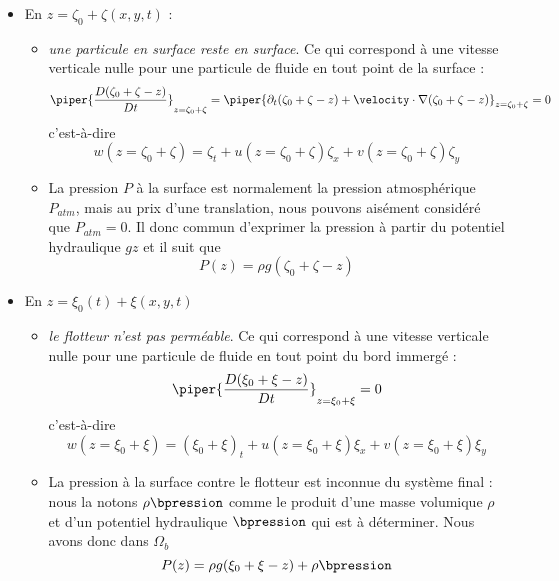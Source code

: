 \begin{itemize}[label=$\mybullet$]
	\item En $z = \zeta_0 + \zeta(x, y, t)$ : 
	\begin{itemize}[label=$\mybullet\mybullet$]
		\item \textit{une particule en surface reste en surface}. Ce qui correspond à une vitesse verticale nulle pour une particule de fluide en tout point de la surface : 
		\begin{equation*}
		\piper{\frac{D (\zeta_0+\zeta - z)}{Dt}}_{z=\zeta_0+\zeta} = \piper{\partial_t (\zeta_0 + \zeta - z) + \velocity \cdot \nabla (\zeta_0 + \zeta - z)}_{z=\zeta_0+\zeta} = 0
		\end{equation*}
		c'est-à-dire
		\begin{equation}
		w(z = \zeta_0+\zeta) = \zeta_t + u(z=\zeta_0 + \zeta)\zeta_x + v(z=\zeta_0+\zeta)\zeta_y \label{eq:surfacecondition}
		\end{equation}
		\item La pression $P$ à la surface est normalement la pression atmosphérique $P_{atm}$, mais au prix d'une translation, nous pouvons aisément considéré que $P_{atm} = 0$. Il donc commun d'exprimer la pression à partir du potentiel hydraulique $gz$ et il suit que 
		\begin{equation}
			P (z) = \rho g (\zeta_0 + \zeta - z)
		\end{equation}
	\end{itemize}

	\item En $z = \xi_0(t) + \xi(x, y, t)$
	\begin{itemize}[label=$\mybullet\mybullet$]
		\item \textit{le flotteur n'est pas perméable}. Ce qui correspond à une vitesse verticale nulle pour une particule de fluide en tout point du bord immergé : 
		\begin{equation*}
		\piper{\frac{D (\xi_0+\xi - z)}{Dt}}_{z=\xi_0+\xi} = 0
		\end{equation*}
		c'est-à-dire
		\begin{equation}
		w(z = \xi_0+\xi) = \left(\xi_0+\xi\right)_t + u(z=\xi_0 + \xi)\xi_x + v(z=\xi_0+\xi)\xi_y \label{eq:surfacecondition_b}
		\end{equation}
		\item La pression à la surface contre le flotteur est inconnue du système final : nous la notons $\rho \bpression$ comme le produit d'une masse volumique $\rho$ et d'un potentiel hydraulique $\bpression$ qui est à déterminer. Nous avons donc dans $\Omega_b$
		\begin{equation}
		P(z) = \rho g (\xi_0 + \xi - z) + \rho\bpression \label{eq:pression_cond}
		\end{equation}
	\end{itemize}


\end{itemize}
